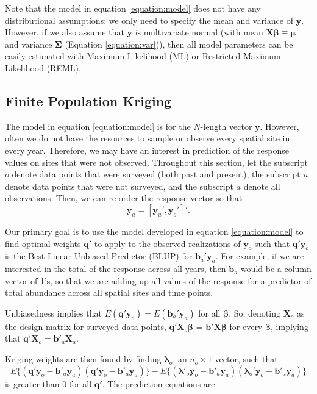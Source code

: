 \documentclass[]{interact}
\theoremstyle{plain}%
\theoremstyle{definition}
\theoremstyle{remark}
\begin{document}
Note that the model in equation \ref{equation:model} does not have any
distributional assumptions: we only need to specify the mean and
variance of \(\mathbf{y}\). However, if we also assume that
\(\mathbf{y}\) is multivariate normal (with mean
\(\mathbf{X} \bm{\beta} \equiv \bm{\mu}\) and variance \(\bm{\Sigma}\)
(Equation \ref{equation:var})), then all model parameters can be easily
estimated with Maximum Likelihood (ML) or Restricted Maximum Likelihood
(REML).

\subsection{Finite Population Kriging} \label{subsection:fpbk}

The model in equation \ref{equation:model} is for the \(N\)-length
vector \(\mathbf{y}\). However, often we do not have the resources to
sample or observe every spatial site in every year. Therefore, we may
have an interest in prediction of the response values on sites that were
not observed. Throughout this section, let the subscript \(o\) denote
data points that were surveyed (both past and present), the subscript
\(u\) denote data points that were not surveyed, and the subscript \(a\)
denote all observations. Then, we can re-order the response vector so
that \mbox{} \begin{equation}
\mathbf{y}_a = [\mathbf{y}_u', \mathbf{y}_o']'.
\end{equation}

Our primary goal is to use the model developed in equation
\ref{equation:model} to find optimal weights \(\mathbf{q}'\) to apply to
the observed realizations of \(\mathbf{y}_o\) such that
\(\mathbf{q}' \mathbf{y}_o\) is the Best Linear Unbiased Predictor
(BLUP) for \(\mathbf{b}_a' \mathbf{y}_a\). For example, if we are
interested in the total of the response across all years, then
\(\mathbf{b}_a\) would be a column vector of 1's, so that we are adding
up all values of the response for a predictor of total abundance across
all spatial sites and time points.

Unbiasedness implies that
\(E(\mathbf{q'}\mathbf{y}_o) = E(\mathbf{b}_a'\mathbf{y}_a)\) for all
\(\bm{\beta}\). So, denoting \(\mathbf{X}_o\) as the design matrix for
surveyed data points, \(\mathbf{q'} \mathbf{X}_o \bm{\beta}\) =
\(\mathbf{b'} \mathbf{X} \bm{\beta}\) for every \(\bm{\beta}\), implying
that \(\mathbf{q'} \mathbf{X}_o = \mathbf{b'}_a \mathbf{X}_a\).

Kriging weights are then found by finding \(\bm{\lambda}_o\), an
\(n_o \times 1\) vector, such that \mbox{} \begin{equation}
E\{(\mathbf{q'}\mathbf{y}_o - \mathbf{b'}_a \mathbf{y}_a)(\mathbf{q'}\mathbf{y}_o - \mathbf{b'}_a \mathbf{y}_a)\} - E\{(\bm{\lambda'}_o\mathbf{y}_o - \mathbf{b'}_a \mathbf{y}_a)(\bm{\lambda}_o'\mathbf{y}_o - \mathbf{b'}_a \mathbf{y}_a)\}
\end{equation} \noindent is greater than 0 for all \(\mathbf{q'}\). The
prediction equations are
\end{document}
